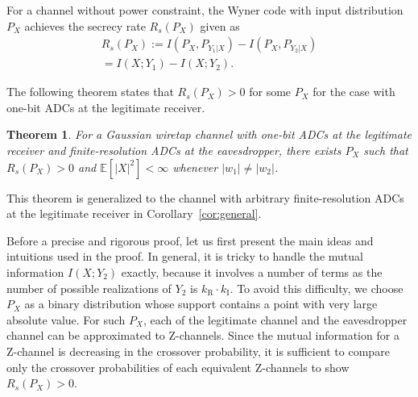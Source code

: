\documentclass[journal]{IEEEtran}
\newtheorem{theorem}{Theorem}[section]
\begin{document}
For a channel without power constraint, the Wyner code \cite{wyner} with input distribution $P_X$ achieves the secrecy rate $R_s(P_X)$ given as 
\begin{multline}
    R_s(P_X) := I(P_X,P_{Y_1|X})-I(P_X,P_{Y_2|X})
    \\= I(X;Y_1)-I(X;Y_2).
\end{multline}

The following theorem states that $R_s(P_X)>0$ for some $P_X$ for the case with one-bit ADCs at the legitimate receiver.
\begin{theorem}
For a Gaussian wiretap channel with one-bit ADCs at the legitimate receiver and finite-resolution ADCs at the eavesdropper, there exists $P_X$ such that $R_s(P_X)>0$ and $\mathbb{E}[|X|^2] < \infty$ whenever $|w_1|\neq |w_2|$.  \label{thm_achievability}
\end{theorem}

This theorem is generalized to the channel with arbitrary finite-resolution ADCs at the legitimate receiver in \mbox{Corollary \ref{cor:general}}. 

Before a precise and rigorous proof, let us first present the main ideas and intuitions used in the proof. 
In general, it is tricky to handle the mutual information $I(X;Y_2)$ exactly, because it involves a number of terms as the number of possible realizations of $Y_2$ is $k_{\mathrm{R}} \cdot k_{\mathrm{I}}$. 
To avoid this difficulty, we choose $P_X$ as a binary distribution whose support contains a point with very large absolute value.
For such $P_X$, each of the legitimate channel and the eavesdropper channel can be approximated to Z-channels. Since the mutual information for a Z-channel is decreasing in the crossover probability, it is sufficient to compare only the crossover probabilities of each equivalent Z-channels to show $R_s(P_X)>0$.
\end{document}
